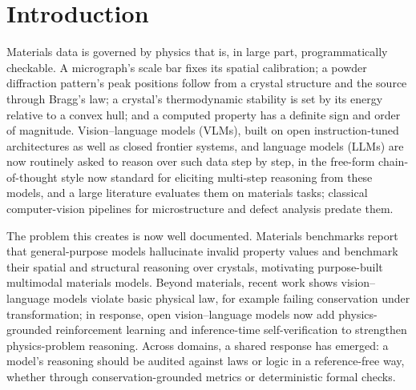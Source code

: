 \documentclass[pdflatex,sn-nature]{sn-jnl}
\begin{document}
\section*{Introduction}
Materials data is governed by physics that is, in large part, programmatically
checkable. A micrograph's scale bar fixes its spatial calibration; a powder
diffraction pattern's peak positions follow from a crystal structure and the source
through Bragg's law; a crystal's thermodynamic stability is set by its energy
relative to a convex hull; and a computed property has a definite sign and order of
magnitude. Vision--language models (VLMs), built on open instruction-tuned
architectures\cite{liu2024llava} as well as closed frontier systems, and language
models (LLMs) are now
routinely asked to reason over such data step by step, in the free-form
chain-of-thought style now standard for eliciting multi-step reasoning from these
models,\cite{wei2022cot} and a large literature evaluates them on
materials tasks;\cite{lai2025materials,npj2026vlmeval,choudhary2025microscopygpt,li2024mmsci}
classical computer-vision pipelines for microstructure and defect analysis predate
them.\cite{holm2020cv,li2018defect}

The problem this creates is now well documented. Materials benchmarks report that
general-purpose models hallucinate invalid property values\cite{llm4matbench2024,lai2025materials}
and benchmark their spatial and structural reasoning over crystals,\cite{atomworld2025}
motivating purpose-built multimodal materials models.\cite{matterchat2026} Beyond
materials, recent work shows vision--language models violate basic physical law,
for example failing conservation under transformation;\cite{conservationbench2026}
in response, open vision--language models now add physics-grounded reinforcement
learning and inference-time self-verification to strengthen physics-problem
reasoning.\cite{p1vl2026} Across domains, a shared response has emerged:
a model's reasoning should be audited against laws or logic in a
reference-free way, whether through conservation-grounded metrics or deterministic
formal checks.\cite{conservationbench2026,neurosymclinical2026}
\end{document}

